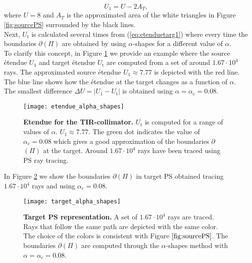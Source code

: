 \begin{equation}\label{eq:Usource}
 U_{1} = U-2A_{T},
 \end{equation}
 where $U=8$ and $A_{T}$ is the approximated area of the white triangles in Figure \ref{fig:sourcePS} surrounded by the black lines.\\ \indent  Next, $U_{\textrm{t}}$ is calculated several times from (\ref{eq:etenduetarg1}) where every time the boundaries $\partial$$(\Pi)$ are obtained by using $\alpha$-shapes for a different value of $\alpha$. 
\\ \indent To clarify this concept, in Figure \ref{fig:etendueTS} we provide an example where the source \'{e}tendue $U_1$ and target \'{e}tendue $U_{\textrm{t}}$ are computed from a set of around $1.67\cdot 10^4$ rays. The approximated source \'{e}tendue $U_1\approx 7.77$ is depicted with the red line. The blue line shows how the \'{e}tendue at the target changes as a function of $\alpha$. The smallest difference $\Delta U = |U_1-U_{\textrm{t}}|$ is obtained using $\alpha = \alpha_\textrm{c} = 0.08$.
 \begin{figure}[t]
  \begin{center}
  \texttt{[image: etendue\_alpha\_shapes]}
  \end{center}
  \caption{\textbf{Etendue for the TIR-collimator.} $U_\textrm{t}$ is computed for a range of values of $\alpha$. $U_1 \approx 7.77$. The green dot indicates the value of $\alpha_\textrm{c} = 0.08$ which gives a good approximation of the boundaries $\partial$$(\Pi)$ at the target.
   Around $1.67 \cdot 10^4$ rays have been traced using PS ray tracing.
  }
  \label{fig:etendueTS}
\end{figure}
In Figure \ref{fig:targetPS} we show the boundaries 
$\partial$$(\Pi)$ in target PS obtained tracing $1.67\cdot10^4$ rays and using $\alpha_\textrm{c}=0.08$.
  \begin{figure}[t]
  \begin{center}
  \texttt{[image: target\_alpha\_shapes]}
  \end{center}
  \caption{\textbf{Target PS representation.} A set of $1.67 \cdot 10^4$ rays are traced.
  Rays that follow the same path are depicted with the same color. The choice of the colors is consistent with Figure $\ref{fig:sourcePS}$. The boundaries $\partial$$(\Pi)$ are computed through the $\alpha$-shapes method with $\alpha = \alpha_\textrm{c} = 0.08$.}
  \label{fig:targetPS}
\end{figure}
